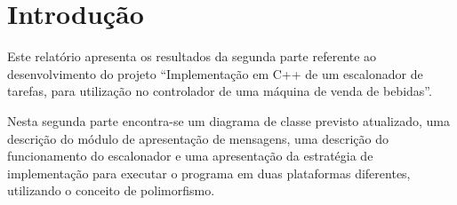 %
%
%
%
%

%
%
%
%
%

\section{Introdução} \label{sec:introduction}

Este relatório apresenta os resultados da segunda parte referente ao desenvolvimento do projeto ``Implementação em C++ de um escalonador de tarefas, para utilização no controlador de uma máquina de venda de bebidas''.

Nesta segunda parte encontra-se um diagrama de classe previsto atualizado, uma descrição do módulo de apresentação de mensagens, uma descrição do funcionamento do escalonador e uma apresentação da estratégia de implementação para executar o programa em duas plataformas diferentes, utilizando o conceito de polimorfismo.
